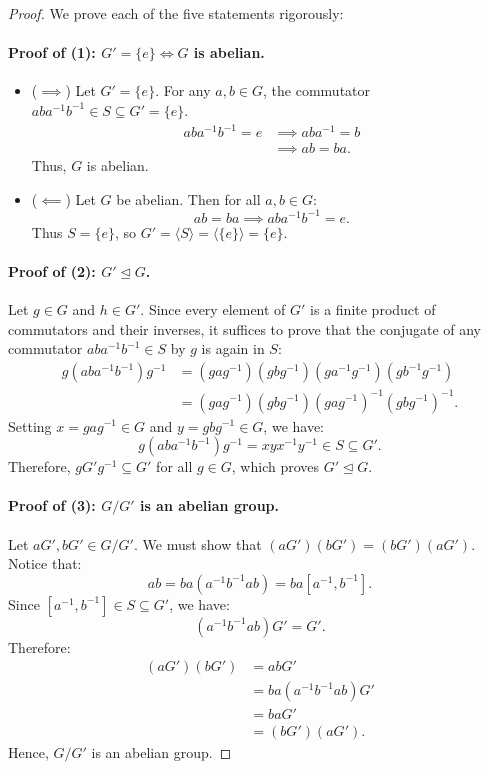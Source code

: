\documentclass[12pt]{article}
\theoremstyle{definition}
\theoremstyle{plain}
\begin{document}
\begin{proof}
We prove each of the five statements rigorously:

\paragraph{Proof of (1): $G' = \{e\} \iff G$ is abelian.}
\begin{itemize}
    \item ($\implies$) Let $G' = \{e\}$.
    For any $a, b \in G$, the commutator $a b a^{-1} b^{-1} \in S \subseteq G' = \{e\}$.
    \begin{align*}
    a b a^{-1} b^{-1} = e &\implies a b a^{-1} = b \\
    &\implies a b = b a.
    \end{align*}
    Thus, $G$ is abelian.
    
    \item ($\impliedby$) Let $G$ be abelian.
    Then for all $a, b \in G$:
    \[
    a b = b a \implies a b a^{-1} b^{-1} = e.
    \]
    Thus $S = \{e\}$, so $G' = \langle S \rangle = \langle \{e\} \rangle = \{e\}$.
\end{itemize}

\paragraph{Proof of (2): $G' \trianglelefteq G$.}
Let $g \in G$ and $h \in G'$.
Since every element of $G'$ is a finite product of commutators and their inverses, it suffices to prove that the conjugate of any commutator $a b a^{-1} b^{-1} \in S$ by $g$ is again in $S$:
\begin{align*}
g (a b a^{-1} b^{-1}) g^{-1} &= (g a g^{-1})(g b g^{-1})(g a^{-1} g^{-1})(g b^{-1} g^{-1}) \\
&= (g a g^{-1})(g b g^{-1})(g a g^{-1})^{-1}(g b g^{-1})^{-1}.
\end{align*}
Setting $x = g a g^{-1} \in G$ and $y = g b g^{-1} \in G$, we have:
\[
g (a b a^{-1} b^{-1}) g^{-1} = x y x^{-1} y^{-1} \in S \subseteq G'.
\]
Therefore, $g G' g^{-1} \subseteq G'$ for all $g \in G$, which proves $G' \trianglelefteq G$.

\paragraph{Proof of (3): $G/G'$ is an abelian group.}
Let $a G', b G' \in G/G'$.
We must show that $(a G')(b G') = (b G')(a G')$.
Notice that:
\[
a b = b a (a^{-1} b^{-1} a b) = b a [a^{-1}, b^{-1}].
\]
Since $[a^{-1}, b^{-1}] \in S \subseteq G'$, we have:
\[
(a^{-1} b^{-1} a b) G' = G'.
\]
Therefore:
\begin{align*}
(a G')(b G') &= a b G' \\
&= b a (a^{-1} b^{-1} a b) G' \\
&= b a G' \\
&= (b G')(a G').
\end{align*}
Hence, $G/G'$ is an abelian group.


\end{proof}
\end{document}
